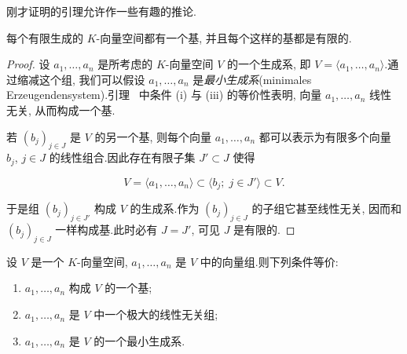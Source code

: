 刚才证明的引理允许作一些有趣的推论.

\begin{theorem}[基的存在性]\label{thm:1.5.6}
每个有限生成的 $K$-向量空间都有一个基, 并且每个这样的基都是有限的.
\end{theorem}

\begin{proof}
设 $a_1, \ldots, a_n$ 是所考虑的 $K$-向量空间 $V$ 的一个生成系, 即 $V = \langle a_1, \ldots, a_n \rangle$.通过缩减这个组, 我们可以假设 $a_1, \ldots, a_n$ 是\emph{最小生成系}(\textup{minimales Erzeugendensystem}).引理~ 中条件 (i) 与 (iii) 的等价性表明, 向量 $a_1, \ldots, a_n$ 线性无关, 从而构成一个基.

若 $(b_j)_{j \in J}$ 是 $V$ 的另一个基, 则每个向量 $a_1, \ldots, a_n$ 都可以表示为有限多个向量 $b_j$, $j \in J$ 的线性组合.因此存在有限子集 $J' \subset J$ 使得

\[
V = \langle a_1, \ldots, a_n \rangle \subset \langle b_j;\; j \in J' \rangle \subset V\text{.}
\]

于是组 $(b_j)_{j \in J'}$ 构成 $V$ 的生成系.作为 $(b_j)_{j \in J}$ 的子组它甚至线性无关, 因而和 $(b_j)_{j \in J}$ 一样构成基.此时必有 $J = J'$, 可见 $J$ 是有限的.
\end{proof}

\begin{theorem}[基的等价刻画]\label{thm:1.5.7}
设 $V$ 是一个 $K$-向量空间, $a_1, \ldots, a_n$ 是 $V$ 中的向量组.则下列条件等价:
\begin{enumerate}
\item[(i)] $a_1, \ldots, a_n$ 构成 $V$ 的一个基;
\item[(ii)] $a_1, \ldots, a_n$ 是 $V$ 中一个极大的线性无关组;
\item[(iii)] $a_1, \ldots, a_n$ 是 $V$ 的一个最小生成系.
\end{enumerate}
\end{theorem}

